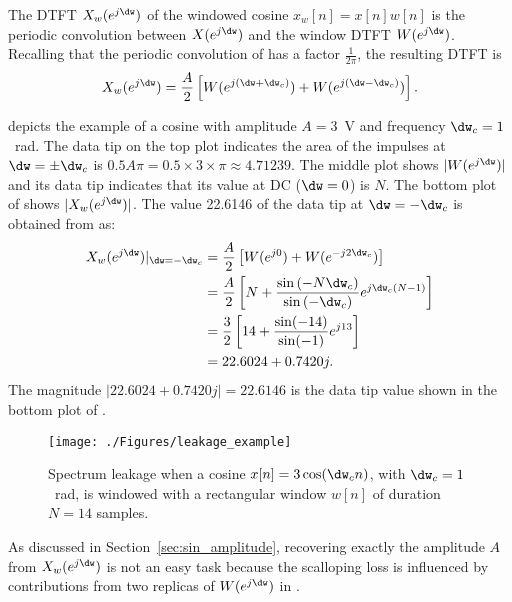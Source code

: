 The DTFT $X_w(e^{j \dw})$ of the windowed cosine $x_w[n]=x[n] w[n]$ is the periodic convolution between $X(e^{j \dw})$ and the window DTFT $W(e^{j \dw})$. Recalling that the periodic convolution of  has a factor $\frac{1}{2\pi}$, the resulting DTFT is
	\begin{equation}
	X_w(e^{j \dw}) = \frac{A}{2} \left[W(e^{j (\dw + \dw_c)}) + W(e^{j (\dw - \dw_c)})\right].
	\label{eq:dtftWindowedCosine}
	\end{equation}

 depicts the example of a cosine with amplitude $A=3$~V and frequency $\dw_c=1$~rad. The data tip on
the top plot indicates the area of the impulses at $\dw=\pm \dw_c$ is $0.5 A \pi = 0.5 \times 3 \times \pi \approx 4.71239$.
The middle plot shows $|W(e^{j \dw})|$ and its data tip indicates that its value at DC ($\dw=0$) is $N$.
The bottom plot of  shows $|X_w(e^{j \dw})|$. The value 22.6146 of the data tip 
at $\dw=-\dw_c$ is obtained from  as:
\begin{align}
	X_w(e^{j \dw})|_{\dw=-\dw_c} &= \frac{A}{2} \left[W(e^{j 0}) + W(e^{-j 2\dw_c})\right] \nonumber \\
	&= \frac{A}{2}  \left[N  + \frac{\sin \left( -N\dw_c \right) }{\sin \left( -\dw_c\right) } e^{j\dw_c(N-1)}\right] \nonumber \\
	&= \frac{3}{2} \left[14 + \frac{\sin(-14)}{\sin(-1)} e^{j 13}\right] \nonumber \\
	&= 22.6024 + 0.7420j. \nonumber
\end{align}
The magnitude $|22.6024 + 0.7420j|=22.6146$ is the data tip value shown in the bottom plot of .

\begin{figure}[htbp]
\centering
\texttt{[image: ./Figures/leakage\_example]}
\caption{Spectrum leakage when a cosine $x[n]=3 \cos(\dw_c n)$, with $\dw_c=1$~rad, is windowed with a
rectangular window $w[n]$ of duration $N=14$ samples.\label{fig:leakage_example}}
\end{figure}

As discussed in Section~\ref{sec:sin_amplitude}, recovering exactly the amplitude $A$ from $X_w(e^{j \dw})$ is not an easy task because the scalloping loss is influenced by contributions from two replicas
of $W(e^{j \dw})$ in .

